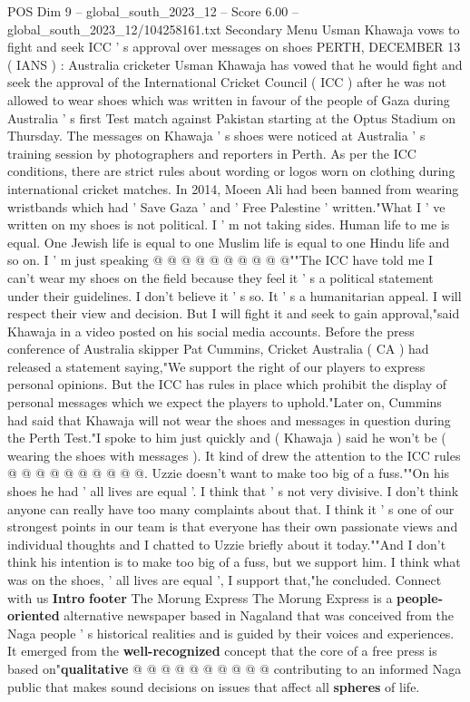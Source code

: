 \begin{textsample}{POS Dim 9 – global\_south\_2023\_12 – Score 6.00 – global\_south\_2023\_12/104258161.txt}  \label{ex:f9_pos_012}
Secondary Menu Usman Khawaja vows to fight and seek ICC ' s approval over messages on shoes PERTH, DECEMBER 13 ( IANS ) : Australia cricketer Usman Khawaja has vowed that he would fight and seek the approval of the International Cricket Council ( ICC ) after he was not allowed to wear shoes which was written in favour of the people of Gaza during Australia ' s first Test match against Pakistan starting at the Optus Stadium on Thursday.
The messages on Khawaja ' s shoes were noticed at Australia ' s training session by photographers and reporters in Perth.
As per the ICC conditions, there are strict rules about wording or logos worn on clothing during international cricket matches.
In 2014, Moeen Ali had been banned from wearing wristbands which had ' Save Gaza ' and ' Free Palestine ' written."What I ' ve written on my shoes is not political.
I ' m not taking sides.
Human life to me is equal.
One Jewish life is equal to one Muslim life is equal to one Hindu life and so on.
I ' m just speaking @ @ @ @ @ @ @ @ @ @""The ICC have told me I can't wear my shoes on the field because they feel it ' s a political statement under their guidelines.
I don't believe it ' s so.
It ' s a humanitarian appeal.
I will respect their view and decision.
But I will fight it and seek to gain approval,"said Khawaja in a video posted on his social media accounts.
Before the press conference of Australia skipper Pat Cummins, Cricket Australia ( CA ) had released a statement saying,"We support the right of our players to express personal opinions.
But the ICC has rules in place which prohibit the display of personal messages which we expect the players to uphold."Later on, Cummins had said that Khawaja will not wear the shoes and messages in question during the Perth Test."I spoke to him just quickly and ( Khawaja ) said he won't be ( wearing the shoes with messages ).
It kind of drew the attention to the ICC rules @ @ @ @ @ @ @ @ @ @.
Uzzie doesn't want to make too big of a fuss.""On his shoes he had ' all lives are equal '.
I think that ' s not very divisive.
I don't think anyone can really have too many complaints about that.
I think it ' s one of our strongest points in our team is that everyone has their own passionate views and individual thoughts and I chatted to Uzzie briefly about it today.""And I don't think his intention is to make too big of a fuss, but we support him.
I think what was on the shoes, ' all lives are equal ', I support that,"he concluded.
Connect with us \textbf{Intro} \textbf{footer} The Morung Express The Morung Express is a \textbf{people-oriented} alternative newspaper based in Nagaland that was conceived from the Naga people ' s historical realities and is guided by their voices and experiences.
It emerged from the \textbf{well-recognized} concept that the core of a free press is based on"\textbf{qualitative} @ @ @ @ @ @ @ @ @ @ contributing to an informed Naga public that makes sound decisions on issues that affect all \textbf{spheres} of life.

\end{textsample}
